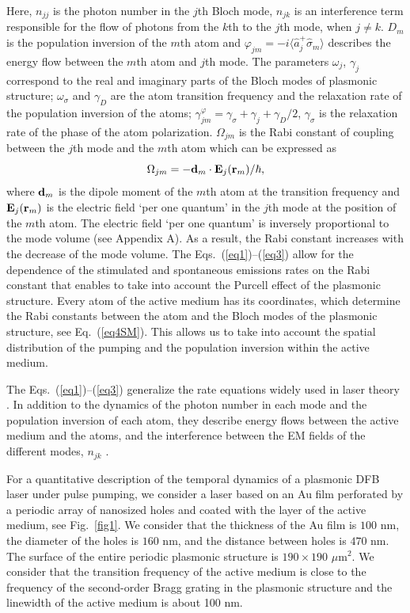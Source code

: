 \documentclass[aps,pra,amsmath,amssymb,onecolumn,superscriptaddress,showpacs,floatfix,]{revtex4-1}
\begin{document}
Here, $n_{jj}$ is the photon number in the $j$th Bloch mode, $n_{jk}$ is an interference term responsible for the flow of photons from the $k$th to the $j$th mode, when $j \neq k$.
$D_m$ is the population inversion of the $m$th atom and $\varphi _{jm} = - i \langle \hat{a} _j^{+} \hat{\sigma} _m \rangle$ describes the energy flow between the $m$th atom and $j$th mode.
The parameters $\omega _j$, $\gamma _j$ correspond to the real and imaginary parts of the Bloch modes of plasmonic structure; $\omega _{\sigma}$ and $\gamma _D$ are the atom transition frequency and the relaxation rate of the population inversion of the atoms; $\gamma _{jm}^{\varphi} = \gamma _{\sigma} + \gamma _j + \gamma _D / 2$, $\gamma _{\sigma}$ is the relaxation rate of the phase of the atom polarization.
$\Omega _{jm}$ is the Rabi constant of coupling between the $j$th mode and the $m$th atom which can be expressed as
\begin{equation}\label{eq4SM}
{\Omega _{jm}} =  - {{\bf{d}}_m} \cdot {{\bf{E}}_j}({{\bf{r}}_m})/ \hbar,
\end{equation}
where ${{\bf{d}}_m}$  is the dipole moment of the $m$th atom at the transition frequency and ${{\bf{E}}_j}({{\bf{r}}_m})$  is the electric field `per one quantum' in the $j$th mode at the position of the $m$th atom. The electric field `per one quantum' is inversely proportional to the mode volume (see Appendix A). As a result, the Rabi constant increases with the decrease of the mode volume. The Eqs.~(\ref{eq1})--(\ref{eq3}) allow for the dependence of the stimulated and spontaneous emissions rates on the Rabi constant that enables to take into account the Purcell effect of the plasmonic structure. Every atom of the active medium has its coordinates, which determine the Rabi constants between the atom and the Bloch modes of the plasmonic structure, see Eq.~(\ref{eq4SM}). This allows us to take into account the spatial distribution of the pumping and the population inversion within the active medium. 

The Eqs.~(\ref{eq1})--(\ref{eq3}) generalize the rate equations widely used in laser theory \cite{SiegmanLasers}.
In addition to the dynamics of the photon number in each mode and the population inversion of each atom, they describe energy flows between the active medium and the atoms, and the interference between the EM fields of the different modes, $n_{jk}$ \cite{Zyablovsky2017approach}. 

For a quantitative description of the temporal dynamics of a plasmonic DFB laser under pulse pumping, we consider a laser based on an Au film perforated by a periodic array of nanosized holes and coated with the layer of the active medium, see Fig.~\ref{fig1}. We consider that the thickness of the Au film is $100$ $\text{nm}$, the diameter of the holes is $160$ $\text{nm}$, and the distance between holes is $470$ $\text{nm}$. The surface of the entire periodic plasmonic structure is $190 \times 190$ $\mu \text{m}^2$. We consider that the transition frequency of the active medium is close to the frequency of the second-order Bragg grating in the plasmonic structure and the linewidth of the active medium is about 100 nm.
\end{document}
